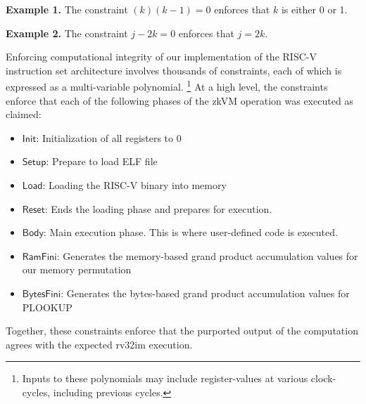 \documentclass[10pt,letterpaper,titlepage]{article}
\theoremstyle{definition}
\begin{document}
\textbf{Example 1.} The constraint $(k)(k-1)=0$ enforces that $k$ is either 0 or 1.

\textbf{Example 2.} The constraint $j-2k=0$ enforces that $j=2k$.

\noindent
Enforcing computational integrity of our implementation of the RISC-V instruction set architecture involves thousands of constraints, each of which is expressed as a multi-variable polynomial.%
\footnote{Inputs to these polynomials may include register-values at various clock-cycles, including previous cycles.}
At a high level, the constraints enforce that each of the following phases of the zkVM operation was executed as claimed:
\begin{itemize}
  \item $\mathsf{Init}$: Initialization of all registers to 0
  \item $\mathsf{Setup}$: Prepare to load ELF file
  \item $\mathsf{Load}$: Loading the RISC-V binary into memory
  \item $\mathsf{Reset}$: Ends the loading phase and prepares for execution.
  \item $\mathsf{Body}$: Main execution phase. This is where user-defined code is executed.
  \item $\mathsf{RamFini}$: Generates the memory-based grand product accumulation values for our memory permutation\cite{plonk}
  \item $\mathsf{BytesFini}$: Generates the bytes-based grand product accumulation values for PLOOKUP\cite{plookup}
\end{itemize}
Together, these constraints enforce that the purported output of the computation agrees with the expected rv32im \cite{rv32im} execution.
\end{document}
